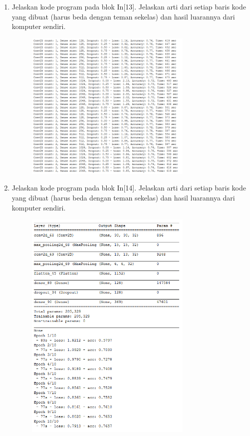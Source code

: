 \begin{enumerate}
	\item Jelaskan kode program pada blok  In[13]. Jelaskan arti dari setiap baris kode yang dibuat (harus beda dengan teman sekelas) dan hasil luarannya dari komputer sendiri.
	\hfill\break

	
	\begin{figure}[H]
		\includegraphics[width=8cm]{figures/1174006/chapter7/praktek/13.png}
		\centering
	\end{figure}

	\item Jelaskan kode program pada blok  In[14]. Jelaskan arti dari setiap baris kode yang dibuat (harus beda dengan teman sekelas) dan hasil luarannya dari komputer sendiri.
	\hfill\break

	
	\begin{figure}[H]
		\includegraphics[width=8cm]{figures/1174006/chapter7/praktek/14.png}
		\centering
	\end{figure}


\end{enumerate}
